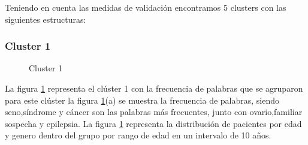 Teniendo en cuenta las medidas de validación encontramos  5 clusters con las siguientes estructuras:

\subsubsection*{Cluster 1}

\begin{figure}[H]
	\centering
	\label{f:nube1}
	\caption{Cluster 1} \label{fig:cluster1}
\end{figure} 

La figura \ref{fig:cluster1} representa el clúster 1 con la frecuencia de palabras que se agruparon para este clúster  la figura \ref{fig:cluster1}(a) se muestra la frecuencia de palabras, siendo seno,síndrome y cáncer son las palabras más frecuentes, junto con ovario,familiar sospecha y epilepsia. La figura \ref{fig:cluster1} representa la distribución de pacientes por edad y genero dentro del grupo por rango de edad en un intervalo de 10 años.\\

